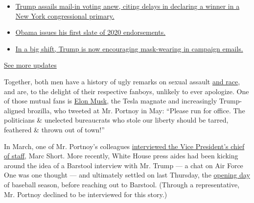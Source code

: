 \begin{itemize}
\tightlist
\item
  \href{https://www.nytimes3xbfgragh.onion/2020/08/03/us/elections/biden-vs-trump.html?action=click\&pgtype=Article\&state=default\&region=MAIN_CONTENT_1\&context=storylines_live_updates\#link-6494b448}{Trump
  assails mail-in voting anew, citing delays in declaring a winner in a
  New York congressional primary.}
\item
  \href{https://www.nytimes3xbfgragh.onion/2020/08/03/us/elections/biden-vs-trump.html?action=click\&pgtype=Article\&state=default\&region=MAIN_CONTENT_1\&context=storylines_live_updates\#link-3de249e6}{Obama
  issues his first slate of 2020 endorsements.}
\item
  \href{https://www.nytimes3xbfgragh.onion/2020/08/03/us/elections/biden-vs-trump.html?action=click\&pgtype=Article\&state=default\&region=MAIN_CONTENT_1\&context=storylines_live_updates\#link-54e34d20}{In
  a big shift, Trump is now encouraging mask-wearing in campaign
  emails.}
\end{itemize}

\href{https://www.nytimes3xbfgragh.onion/2020/08/03/us/elections/biden-vs-trump.html?action=click\&pgtype=Article\&state=default\&region=MAIN_CONTENT_1\&context=storylines_live_updates}{See
more updates}

Together, both men have a history of ugly remarks on sexual assault
\href{https://www.nydailynews.com/sports/football/ny-barstool-sports-portnoy-racism-20200706-6qoawvrjbnce5cygbknhlp2wwe-story.html}{and
race}, and are, to the delight of their respective fanboys, unlikely to
ever apologize. One of those mutual fans is
\href{https://www.nytimes3xbfgragh.onion/2020/07/25/style/elon-musk-maureen-dowd.html}{Elon
Musk}, the Tesla magnate and increasingly Trump-aligned brozilla, who
tweeted at Mr. Portnoy in May: ``Please run for office. The politicians
\& unelected bureaucrats who stole our liberty should be tarred,
feathered \& thrown out of town!''

In March, one of Mr. Portnoy's colleagues
\href{https://www.barstoolsports.com/video/2198855/riggs-visits-white-house-grounds-for-coronavirus-interview-with-vp-chief-of-staff-marc-short}{interviewed
the Vice President's chief of staff}, Marc Short. More recently, White
House press aides had been kicking around the idea of a Barstool
interview with Mr. Trump --- a chat on Air Force One was one thought ---
and ultimately settled on last Thursday, the
\href{https://www.nytimes3xbfgragh.onion/2020/07/29/sports/baseball/mlb-season-coronavirus.html}{opening
day} of baseball season, before reaching out to Barstool. (Through a
representative, Mr. Portnoy declined to be interviewed for this story.)


